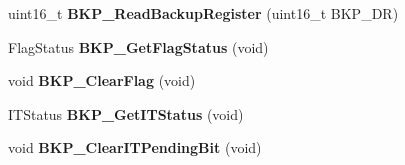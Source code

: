 \begin{DoxyCompactItemize}
\item 
\hypertarget{group__BKP__Exported__Functions_ga359d8fbc945e0f4e34fedbe037d842c8}{
uint16\_\-t {\bfseries BKP\_\-ReadBackupRegister} (uint16\_\-t BKP\_\-DR)}
\label{group__BKP__Exported__Functions_ga359d8fbc945e0f4e34fedbe037d842c8}

\item 
\hypertarget{group__BKP__Exported__Functions_gacc9aedde760383f0bd146f0d77a547db}{
FlagStatus {\bfseries BKP\_\-GetFlagStatus} (void)}
\label{group__BKP__Exported__Functions_gacc9aedde760383f0bd146f0d77a547db}

\item 
\hypertarget{group__BKP__Exported__Functions_ga3f3aea5b0a3d8d5d79b0b506928351ea}{
void {\bfseries BKP\_\-ClearFlag} (void)}
\label{group__BKP__Exported__Functions_ga3f3aea5b0a3d8d5d79b0b506928351ea}

\item 
\hypertarget{group__BKP__Exported__Functions_ga99566c9f1f17f499020606cb63511494}{
ITStatus {\bfseries BKP\_\-GetITStatus} (void)}
\label{group__BKP__Exported__Functions_ga99566c9f1f17f499020606cb63511494}

\item 
\hypertarget{group__BKP__Exported__Functions_ga6a93ef8e40959bb10fea670e2040ad74}{
void {\bfseries BKP\_\-ClearITPendingBit} (void)}
\label{group__BKP__Exported__Functions_ga6a93ef8e40959bb10fea670e2040ad74}

\end{DoxyCompactItemize}
